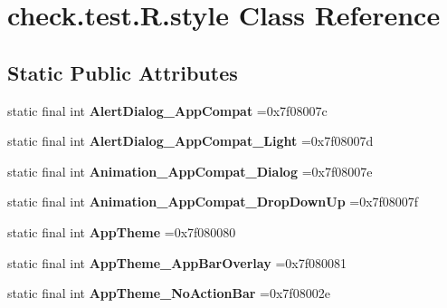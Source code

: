 \hypertarget{classcheck_1_1test_1_1_r_1_1style}{}\section{check.\+test.\+R.\+style Class Reference}
\label{classcheck_1_1test_1_1_r_1_1style}
\subsection*{Static Public Attributes}
\begin{DoxyCompactItemize}
\item 
\hypertarget{classcheck_1_1test_1_1_r_1_1style_aa5d5dcbf14e27b682e2eebc4b98052b6}{}static final int {\bfseries Alert\+Dialog\+\_\+\+App\+Compat} =0x7f08007c\label{classcheck_1_1test_1_1_r_1_1style_aa5d5dcbf14e27b682e2eebc4b98052b6}

\item 
\hypertarget{classcheck_1_1test_1_1_r_1_1style_a042ebe50c854f5efb0a09e0e88baec30}{}static final int {\bfseries Alert\+Dialog\+\_\+\+App\+Compat\+\_\+\+Light} =0x7f08007d\label{classcheck_1_1test_1_1_r_1_1style_a042ebe50c854f5efb0a09e0e88baec30}

\item 
\hypertarget{classcheck_1_1test_1_1_r_1_1style_acdb3fe6bca8f5ba0e760a25d846ad093}{}static final int {\bfseries Animation\+\_\+\+App\+Compat\+\_\+\+Dialog} =0x7f08007e\label{classcheck_1_1test_1_1_r_1_1style_acdb3fe6bca8f5ba0e760a25d846ad093}

\item 
\hypertarget{classcheck_1_1test_1_1_r_1_1style_a529cd1dbbb2833b3b2058fec7c0a8f52}{}static final int {\bfseries Animation\+\_\+\+App\+Compat\+\_\+\+Drop\+Down\+Up} =0x7f08007f\label{classcheck_1_1test_1_1_r_1_1style_a529cd1dbbb2833b3b2058fec7c0a8f52}

\item 
\hypertarget{classcheck_1_1test_1_1_r_1_1style_ad089d681424fa4fcbf7bd30f978f7ff9}{}static final int {\bfseries App\+Theme} =0x7f080080\label{classcheck_1_1test_1_1_r_1_1style_ad089d681424fa4fcbf7bd30f978f7ff9}

\item 
\hypertarget{classcheck_1_1test_1_1_r_1_1style_a0047d0ca8442c354d0ba10572bd2c81b}{}static final int {\bfseries App\+Theme\+\_\+\+App\+Bar\+Overlay} =0x7f080081\label{classcheck_1_1test_1_1_r_1_1style_a0047d0ca8442c354d0ba10572bd2c81b}

\item 
\hypertarget{classcheck_1_1test_1_1_r_1_1style_a9292ba161b6075489472164a5cf195bb}{}static final int {\bfseries App\+Theme\+\_\+\+No\+Action\+Bar} =0x7f08002e\label{classcheck_1_1test_1_1_r_1_1style_a9292ba161b6075489472164a5cf195bb}


\end{DoxyCompactItemize}
